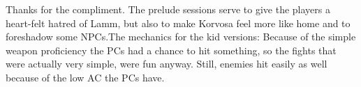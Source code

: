 Thanks for the compliment. The prelude sessions serve to give the players a heart-felt hatred of Lamm, but also to make Korvosa feel more like home and to foreshadow some NPCs.The mechanics for the kid versions: Because of the simple weapon proficiency the PCs had a chance to hit something, so the fights that were actually very simple, were fun anyway. Still, enemies hit easily as well because of the low AC the PCs have. 